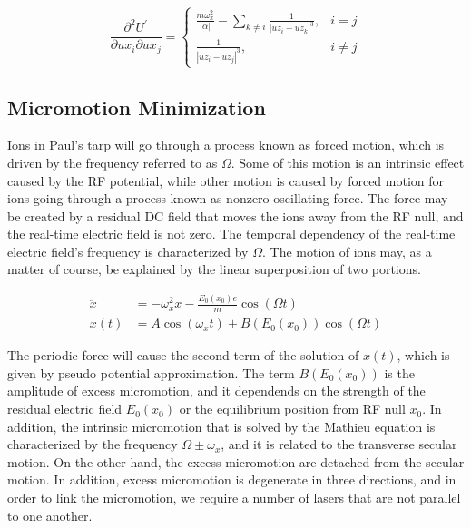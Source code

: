 \begin{equation}
    \frac{\partial^2 U^{\prime}}{\partial u x_i \partial u x_j}= \begin{cases}\frac{m \omega_x^2}{|\alpha|}-\sum_{k \neq i} \frac{1}{\left|u z_i-u z_k\right|^3}, & i=j \\ \frac{1}{\left|u z_i-u z_j\right|^3}, & i \neq j\end{cases}
\end{equation}

\subsection{Micromotion Minimization}

Ions in Paul's tarp will go through a process known as forced motion, which is driven by the frequency referred to as \(\Omega\). Some of this motion is an intrinsic effect caused by the RF potential, while other motion is caused by forced motion for ions going through a process known as nonzero oscillating force. The force may be created by a residual DC field that moves the ions away from the RF null, and the real-time electric field is not zero. The temporal dependency of the real-time electric field's frequency is characterized by \(\Omega\). The motion of ions may, as a matter of course, be explained by the linear superposition of two portions.

\begin{equation}\label{eq:excess_micromotion}
    \begin{aligned}
        \ddot{x} & =-\omega_x^2 x-\frac{E_0\left(x_0\right) e}{m} \cos (\Omega t)                    \\
        x(t)     & =A \cos \left(\omega_x t\right)+B\left(E_0\left(x_0\right)\right) \cos (\Omega t)
    \end{aligned}
\end{equation}

The periodic force will cause the second term of the solution of \(x(t)\), which is given by pseudo potential approximation. The term \(B(E_0(x_0))\) is the amplitude of excess micromotion, and it dependends on the strength of the residual electric field \(E_0(x_0)\) or the equilibrium position from RF null \(x_0\). In addition, the intrinsic micromotion that is solved by the Mathieu equation is characterized by the frequency \(\Omega\pm \omega_x\), and it is related to the transverse secular motion. On the other hand, the excess micromotion are detached from the secular motion. In addition, excess micromotion is degenerate in three directions, and in order to link the micromotion, we require a number of lasers that are not parallel to one another.

